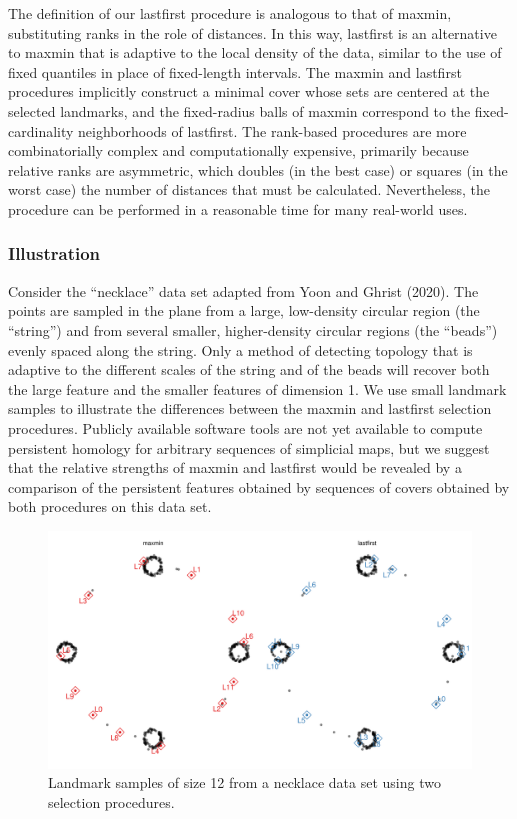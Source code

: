\documentclass{article}
\begin{document}
The definition of our lastfirst procedure is analogous to that of
maxmin, substituting ranks in the role of distances. In this way,
lastfirst is an alternative to maxmin that is adaptive to the local
density of the data, similar to the use of fixed quantiles in place of
fixed-length intervals. The maxmin and lastfirst procedures implicitly
construct a minimal cover whose sets are centered at the selected
landmarks, and the fixed-radius balls of maxmin correspond to the
fixed-cardinality neighborhoods of lastfirst. The rank-based procedures
are more combinatorially complex and computationally expensive,
primarily because relative ranks are asymmetric, which doubles (in the
best case) or squares (in the worst case) the number of distances that
must be calculated. Nevertheless, the procedure can be performed in a
reasonable time for many real-world uses.

\hypertarget{illustration}{%
\subsubsection{Illustration}\label{illustration}}

Consider the ``necklace'' data set adapted from Yoon and Ghrist (2020).
The points are sampled in the plane from a large, low-density circular
region (the ``string'') and from several smaller, higher-density
circular regions (the ``beads'') evenly spaced along the string. Only a
method of detecting topology that is adaptive to the different scales of
the string and of the beads will recover both the large feature and the
smaller features of dimension 1. We use small landmark samples to
illustrate the differences between the maxmin and lastfirst selection
procedures. Publicly available software tools are not yet available to
compute persistent homology for arbitrary sequences of simplicial maps,
but we suggest that the relative strengths of maxmin and lastfirst would
be revealed by a comparison of the persistent features obtained by
sequences of covers obtained by both procedures on this data set.

\begin{figure}
\includegraphics[width=\textwidth]{../figures/necklace-landmarks}
\caption{
Landmark samples of size 12 from a necklace data set using two selection procedures.
\label{fig:necklace}
}
\end{figure}
\end{document}

